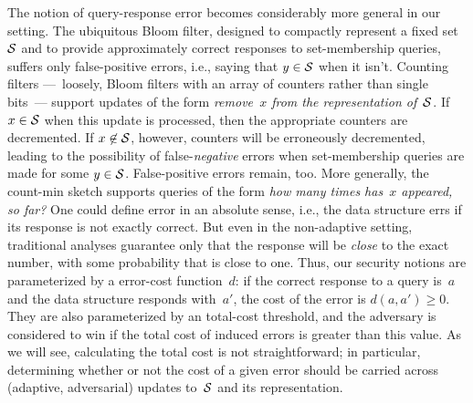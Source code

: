 The notion of query-response error becomes considerably more
general in our setting.   The ubiquitous Bloom filter, designed to
compactly represent a fixed set~$\mathcal{S}$ and to provide approximately
correct responses to set-membership queries, suffers only
false-positive errors, i.e., saying that $y \in \mathcal{S}$ when it isn't.
Counting filters ---~loosely, Bloom filters
with an array of counters rather than single bits~--- support updates
of the form \emph{remove~$x$ from the representation of~$\mathcal{S}$}.  If
$x \in \mathcal{S}$ when this update is processed, then the appropriate
counters are decremented.  If $x \not\in \mathcal{S}$, however, counters will
be erroneously decremented, leading to the possibility of
false-\emph{negative} errors when set-membership queries are made for some $y
\in \mathcal{S}$.  False-positive errors remain, too.
More generally, the count-min sketch supports queries of the
form \emph{how many times has~$x$ appeared, so far?}  One could define
error in an absolute sense, i.e., the data structure errs if its
response is not exactly correct.  But even in the non-adaptive
setting, traditional analyses guarantee only that the response will be
\emph{close} to the exact number, with some probability that is close
to one.  Thus, our security notions are parameterized by a
error-cost function~$d$: if the correct response to a query is~$a$ and
the data structure responds with~$a'$, the cost of the error is
$d(a,a') \geq 0$.  
%
They are also parameterized by an total-cost threshold, and
the adversary is considered to win if the total cost of induced
errors is greater than this value.  As we will see, calculating the
total cost is not straightforward; in particular, determining whether
or not the cost of a given error should be carried across (adaptive,
adversarial) updates to~$\mathcal{S}$ and its representation.




